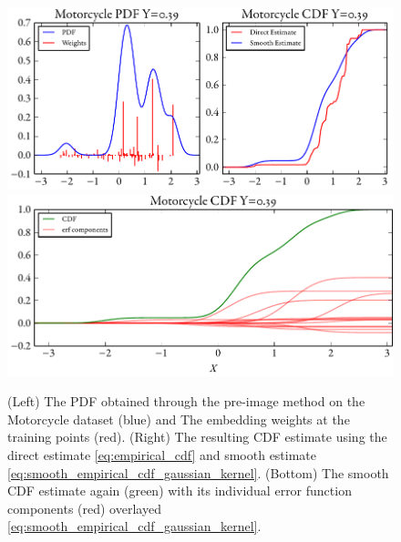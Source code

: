 \documentclass[twoside]{article} \usepackage{aistats2017}
\theoremstyle{definition}
\theoremstyle{theorem}
\begin{document}
		\begin{figure}
			\begin{center}
				\includegraphics[width=\columnwidth]{figures/cumulativeexamplesmooth}
				\includegraphics[width=\columnwidth]{figures/cumulativeexampleerf}
			\end{center}
			\caption{\small (Left) The PDF obtained through the pre-image method on the Motorcycle dataset (blue) and The embedding weights at the training points (red). (Right) The resulting CDF estimate using the direct estimate \eqref{eq:empirical_cdf} and smooth estimate \eqref{eq:smooth_empirical_cdf_gaussian_kernel}. (Bottom) The smooth CDF estimate again (green) with its individual error function components (red) overlayed \eqref{eq:smooth_empirical_cdf_gaussian_kernel}.}
			\label{fig:direct_quantile_regression}
		\end{figure}
		
\end{document}
